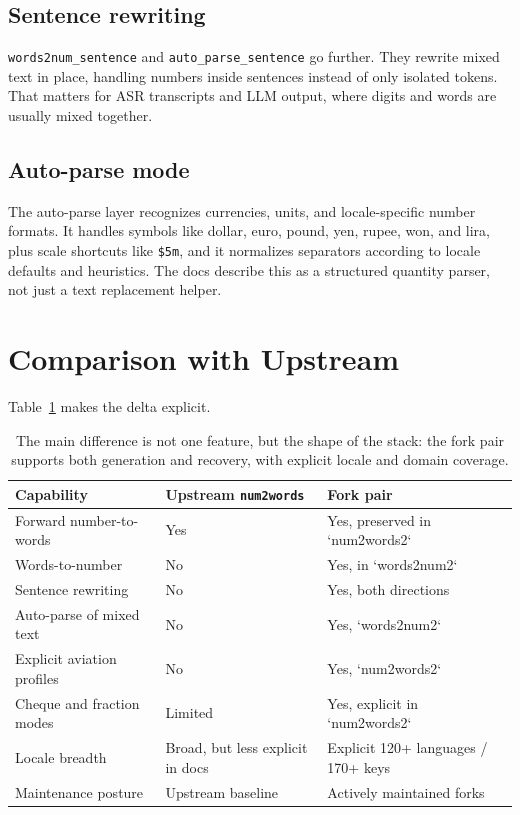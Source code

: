 \documentclass{article}
\begin{document}
\subsection{Sentence rewriting}
\texttt{words2num\_sentence} and \texttt{auto\_parse\_sentence} go further. They rewrite mixed
text in place, handling numbers inside sentences instead of only isolated
tokens. That matters for ASR transcripts and LLM output, where digits and words
are usually mixed together.

\subsection{Auto-parse mode}
The auto-parse layer recognizes currencies, units, and locale-specific number
formats. It handles symbols like dollar, euro, pound, yen, rupee, won, and lira, plus
scale shortcuts like \texttt{\$5m}, and it normalizes separators according to locale
defaults and heuristics. The docs describe this as a structured quantity parser,
not just a text replacement helper.

\section{Comparison with Upstream}
Table~\ref{tab:compare} makes the delta explicit.

\begin{table}[!ht]
\centering
\small
\setlength{\tabcolsep}{4pt}
\begin{tabular}{p{2.7cm} p{2.25cm} p{2.25cm}}
\toprule
Capability & Upstream \texttt{num2words} & Fork pair \\
\midrule
Forward number-to-words & Yes & Yes, preserved in `num2words2` \\
Words-to-number & No & Yes, in `words2num2` \\
Sentence rewriting & No & Yes, both directions \\
Auto-parse of mixed text & No & Yes, `words2num2` \\
Explicit aviation profiles & No & Yes, `num2words2` \\
Cheque and fraction modes & Limited & Yes, explicit in `num2words2` \\
Locale breadth & Broad, but less explicit in docs & Explicit 120+ languages / 170+ keys \\
Maintenance posture & Upstream baseline & Actively maintained forks \\
\bottomrule
\end{tabular}
\caption{The main difference is not one feature, but the shape of the stack:
the fork pair supports both generation and recovery, with explicit locale and
domain coverage.}
\label{tab:compare}
\end{table}
\end{document}
